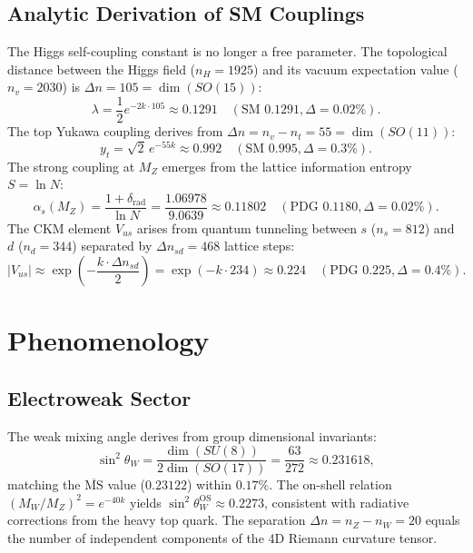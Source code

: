 \documentclass[reprint,aps,prd,twocolumn,showkeys,nofootinbib]{revtex4-2}
\begin{document}
\subsection{Analytic Derivation of SM Couplings}
The Higgs self-coupling constant is no longer a free parameter. The topological distance between the Higgs field ($n_H=1925$) and its vacuum expectation value ($n_v=2030$) is $\Delta n=105 = \dim(SO(15))$:
\begin{equation}
\lambda = \frac12 e^{-2k\cdot 105} \approx 0.1291 \quad (\text{SM } 0.1291, \Delta=0.02\%).
\label{eq:lambda}
\end{equation}
The top Yukawa coupling derives from $\Delta n = n_v - n_t = 55 = \dim(SO(11))$:
\begin{equation}
y_t = \sqrt{2}\, e^{-55k} \approx 0.992 \quad (\text{SM } 0.995, \Delta=0.3\%).
\label{eq:yt}
\end{equation}
The strong coupling at $M_Z$ emerges from the lattice information entropy $S=\ln N$:
\begin{equation}
\alpha_s(M_Z) = \frac{1+\delta_{\text{rad}}}{\ln N} = \frac{1.06978}{9.0639} \approx 0.11802 \quad (\text{PDG } 0.1180, \Delta=0.02\%).
\label{eq:alphas}
\end{equation}
The CKM element $V_{us}$ arises from quantum tunneling between $s$ ($n_s=812$) and $d$ ($n_d=344$) separated by $\Delta n_{sd}=468$ lattice steps:
\begin{equation}
|V_{us}| \approx \exp\!\left(-\frac{k\cdot\Delta n_{sd}}{2}\right) = \exp(-k\cdot 234) \approx 0.224 \quad (\text{PDG } 0.225, \Delta=0.4\%).
\label{eq:ckm}
\end{equation}

\section{Phenomenology}

\subsection{Electroweak Sector}
The weak mixing angle derives from group dimensional invariants:
\begin{equation}
\sin^2\theta_W = \frac{\dim(SU(8))}{2\dim(SO(17))} = \frac{63}{272} \approx 0.231618,
\end{equation}
matching the $\overline{\text{MS}}$ value ($0.23122$) within $0.17\%$. The on-shell relation $(M_W/M_Z)^2 = e^{-40k}$ yields $\sin^2\theta_W^{\text{OS}}\approx0.2273$, consistent with radiative corrections from the heavy top quark. The separation $\Delta n = n_Z-n_W = 20$ equals the number of independent components of the 4D Riemann curvature tensor.
\end{document}
